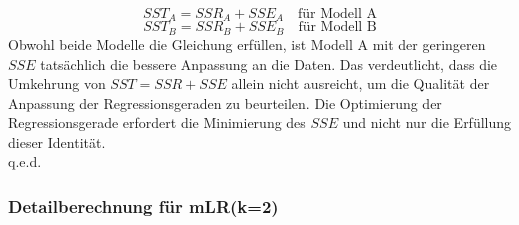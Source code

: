 \documentclass[12pt]{article}
\begin{document}
\[SST_A = SSR_A + SSE_A \quad \text{für Modell A}\]
\[SST_B = SSR_B + SSE_B \quad \text{für Modell B}\]
%
Obwohl beide Modelle die Gleichung erfüllen, ist Modell A mit der geringeren \(SSE\) tatsächlich die bessere Anpassung an die Daten. Das verdeutlicht, dass die Umkehrung von \(SST = SSR + SSE\) allein nicht ausreicht, um die Qualität der Anpassung der Regressionsgeraden zu beurteilen. Die Optimierung der Regressionsgerade erfordert die Minimierung des \(SSE\) und nicht nur die Erfüllung dieser Identität.\\
q.e.d.

\subsubsection{Detailberechnung für mLR(k=2)}

{\color{red}{***********************************************************************\\ 
Umsetzen der Detail-Berechnung für den Fall (k=2) mit den folgenden Folien ..\\
************************************************************************}}\\[0.2cm]
\end{document}
